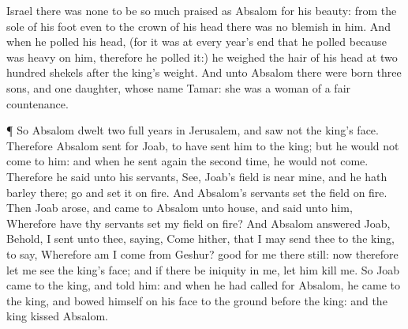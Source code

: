 {Israel there was
none to be so
much
praised as
Absalom for his
beauty: from the
sole of his
foot even to the crown of his
head there was no
blemish in him.
And when he
polled his
head, (for it was at every
year’s
end that he
polled
{} because
{} was
heavy on him, therefore he
polled it:) he
weighed the
hair of his
head at two
hundred
shekels after the
king’s
weight.
And unto
Absalom there were
born
three
sons, and
one
daughter, whose
name
{}
Tamar: she was a
woman of a
fair
countenance.
\par }{\PP {}¶ So
Absalom
dwelt two
full
years in
Jerusalem, and
saw not the
king’s
face.
Therefore
Absalom
sent for
Joab, to have
sent him to the
king; but he
would not
come to him: and when he sent
again the second
time, he
would not
come.
Therefore he
said unto his
servants,
See,
Joab’s
field is
near
mine, and he hath
barley there;
go and
set it on
fire. And
Absalom’s
servants
set the
field on
fire.
Then
Joab
arose, and
came to
Absalom unto
{}
house, and
said unto him, Wherefore have thy
servants
set my
field on
fire?
And
Absalom
answered
Joab, Behold, I
sent unto thee,
saying,
Come hither, that I may
send thee to the
king, to
say, Wherefore am I
come from
Geshur?
{}
good for me
{} there still: now therefore let me
see the
king’s
face; and if there
be
{}
iniquity in me, let him
kill me.
So
Joab
came to the
king, and
told him: and when he had
called for
Absalom, he
came to the
king, and
bowed himself on his
face to the
ground
before the
king: and the
king
kissed
Absalom.

}
